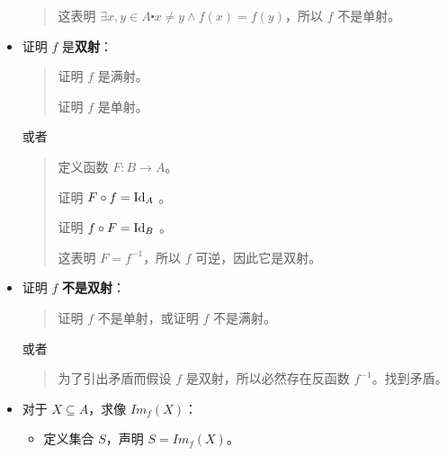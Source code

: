 \begin{itemize}
\begin{quote}
              这表明 $\exists x, y \in A \centerdot x \ne y \land f(x) = f(y)$，所以 $f$ 不是单射。
          \end{quote}
    \item 证明 $f$ 是\textbf{双射}：
          \begin{quote}
              证明 $f$ 是满射。

              证明 $f$ 是单射。
          \end{quote}
          或者
          \begin{quote}
              定义函数 $F:B \to A$。

              证明 $F \circ f = \text{Id}_A$ 。

              证明 $f \circ F = \text{Id}_B$ 。

              这表明 $F = f^{-1}$，所以 $f$ 可逆，因此它是双射。
          \end{quote}
    \item 证明 $f$ \textbf{不是双射}：
          \begin{quote}
              证明 $f$ 不是单射，或证明 $f$ 不是满射。
          \end{quote}
          或者
          \begin{quote}
              为了引出矛盾而假设 $f$ 是双射，所以必然存在反函数 $f^{-1}$。找到矛盾。
          \end{quote}
    \item 对于 $X \subseteq A$，求像 $Im_f (X)$：
          \begin{itemize}
              \item 定义集合 $S$，声明 $S = Im_f(X)$。


\end{itemize}
\end{itemize}
